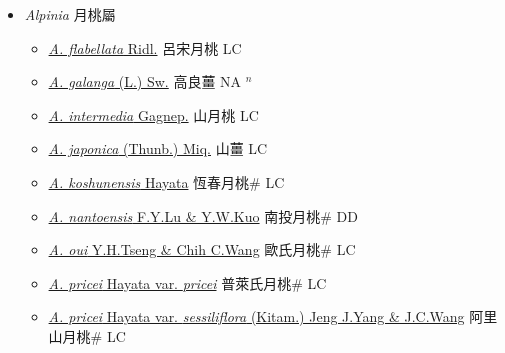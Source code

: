 
  \begin{itemize}
 \item[] \textit{Alpinia} 月桃屬
                    
  \begin{itemize}
        \item[] \href{http://www.theplantlist.org/tpl1.1/search?q=Alpinia+flabellata}{\textit{A. flabellata} Ridl.}   呂宋月桃 LC
        \item[] \href{http://www.theplantlist.org/tpl1.1/search?q=Alpinia+galanga}{\textit{A. galanga} (L.) Sw.}   高良薑 NA $^n$
        \item[] \href{http://www.theplantlist.org/tpl1.1/search?q=Alpinia+intermedia}{\textit{A. intermedia} Gagnep.}   山月桃 LC
        \item[] \href{http://www.theplantlist.org/tpl1.1/search?q=Alpinia+japonica}{\textit{A. japonica} (Thunb.) Miq.}   山薑 LC
        \item[] \href{http://www.theplantlist.org/tpl1.1/search?q=Alpinia+koshunensis}{\textit{A. koshunensis} Hayata}   恆春月桃\# LC
        \item[] \href{http://www.theplantlist.org/tpl1.1/search?q=Alpinia+nantoensis}{\textit{A. nantoensis} F.Y.Lu \& Y.W.Kuo}   南投月桃\# DD
        \item[] \href{http://www.theplantlist.org/tpl1.1/search?q=Alpinia+oui}{\textit{A. oui} Y.H.Tseng \& Chih C.Wang}   歐氏月桃\# LC
        \item[] \href{http://www.theplantlist.org/tpl1.1/search?q=Alpinia+pricei+var.+pricei}{\textit{A. pricei} Hayata var. \textit{pricei}}   普萊氏月桃\# LC
        \item[] \href{http://www.theplantlist.org/tpl1.1/search?q=Alpinia+pricei+var.+sessiliflora}{\textit{A. pricei} Hayata var. \textit{sessiliflora} (Kitam.) Jeng J.Yang \& J.C.Wang}   阿里山月桃\# LC

\end{itemize}
\end{itemize}
